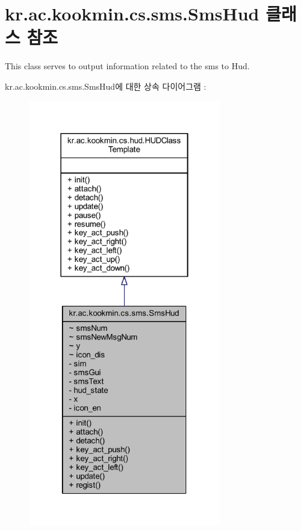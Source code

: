 \hypertarget{classkr_1_1ac_1_1kookmin_1_1cs_1_1sms_1_1_sms_hud}{}\section{kr.\+ac.\+kookmin.\+cs.\+sms.\+Sms\+Hud 클래스 참조}
\label{classkr_1_1ac_1_1kookmin_1_1cs_1_1sms_1_1_sms_hud}


This class serves to output information related to the sms to Hud.  




kr.\+ac.\+kookmin.\+cs.\+sms.\+Sms\+Hud에 대한 상속 다이어그램 \+: \nopagebreak
\begin{figure}[H]
\begin{center}
\leavevmode
\includegraphics[width=238pt]{classkr_1_1ac_1_1kookmin_1_1cs_1_1sms_1_1_sms_hud__inherit__graph}
\end{center}
\end{figure}


